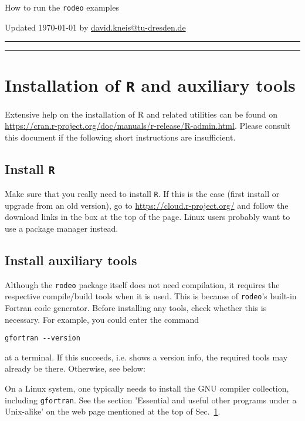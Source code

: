 \documentclass[10pt,a4paper]{article}
\author{dkneis}
\begin{document}
\newcommand{\software}[1]{\texttt{#1}}

{\LARGE How to run the \software{rodeo} examples}

\vspace{5mm}
Updated \today{} by \url{david.kneis@tu-dresden.de}

\vspace{5mm}
\hrule

\tableofcontents

\vspace{5mm}
\hrule

\section{Installation of \software{R} and auxiliary tools} \label{sec:install}

Extensive help on the installation of R and related utilities can be found on \url{https://cran.r-project.org/doc/manuals/r-release/R-admin.html}. Please consult this document if the following short instructions are insufficient.

\subsection{Install \software{R}}
Make sure that you really need to install \software{R}. If this is the case (first install or upgrade from an old version), go to \url{https://cloud.r-project.org/} and follow the download links in the box at the top of the page. Linux users probably want to use a package manager instead.

\subsection{Install auxiliary tools}
Although the \software{rodeo} package itself does not need compilation, it requires the respective compile/build tools when it is used. This is because of \software{rodeo}'s built-in Fortran code generator. Before installing any tools, check whether this is necessary. For example, you could enter the command

\begin{verbatim}
gfortran --version
\end{verbatim}

at a terminal. If this succeeds, i.e. shows a version info, the required tools may already be there. Otherwise, see below:

On a Linux system, one typically needs to install the GNU compiler collection, including \software{gfortran}. See the section 'Essential and useful other programs under a Unix-alike' on the web page mentioned at the top of Sec.~\ref{sec:install}.
\end{document}
